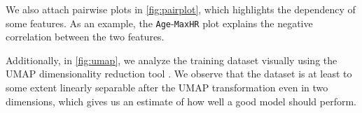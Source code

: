 We also attach pairwise plots in \autoref{fig:pairplot}, which highlights the dependency of some features. As an example, the \texttt{Age}-\texttt{MaxHR} plot explains the negative correlation between the two features.

Additionally, in \autoref{fig:umap}, we analyze the training dataset visually using the UMAP dimensionality reduction tool \cite{mcinnesUMAPUniformManifold2020}. We observe that the dataset is at least to some extent linearly separable after the UMAP transformation even in two dimensions, which gives us an estimate of how well a good model should perform.
